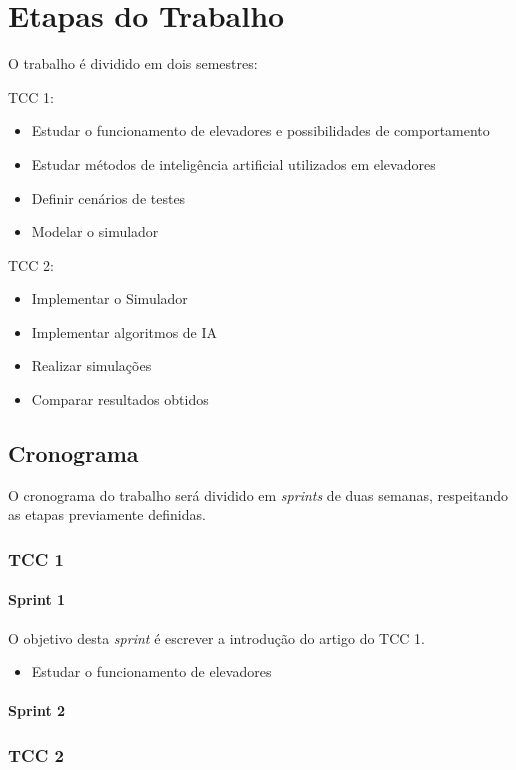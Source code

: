 \chapter{\label{chap:stages}Etapas do Trabalho}

O trabalho é dividido em dois semestres:

TCC 1:
\begin{itemize}
    \item Estudar o funcionamento de elevadores e possibilidades de
          comportamento
    \item Estudar métodos de inteligência artificial utilizados em elevadores
    \item Definir cenários de testes
    \item Modelar o simulador
\end{itemize}

TCC 2:
\begin{itemize}
    \item Implementar o Simulador
    \item Implementar algoritmos de IA
    \item Realizar simulações
    \item Comparar resultados obtidos
\end{itemize}

\section{Cronograma}

O cronograma do trabalho será dividido em \textit{sprints} de duas semanas,
respeitando as etapas previamente definidas.

\subsection{TCC 1}

\subsubsection{Sprint 1}
O objetivo desta \textit{sprint} é escrever a introdução do artigo do TCC 1.
\begin{itemize}
    \item Estudar o funcionamento de elevadores
\end{itemize}

\subsubsection{Sprint 2}

\subsection{TCC 2}
